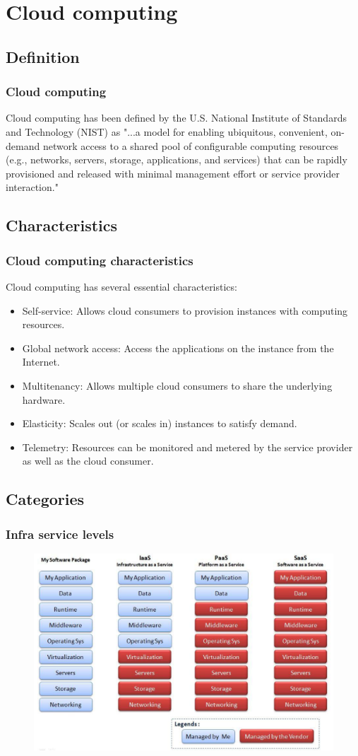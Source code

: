 \section{Cloud computing} 

\subsection{Definition} 
\begin{frame}
	\frametitle{Cloud computing}
	Cloud computing has been defined by the U.S. National
	Institute of Standards and Technology (NIST) as
	"...a model for enabling ubiquitous, convenient, on-demand
	network access to a shared pool of configurable computing
	resources (e.g., networks, servers, storage, applications,
	and services) that can be rapidly provisioned and released
	with minimal management effort or service provider interaction."
\end{frame}

\subsection{Characteristics}
\begin{frame}
	\frametitle{Cloud computing characteristics}
		Cloud computing has several essential characteristics:
	\begin{itemize}
		\item Self-service: Allows cloud consumers to provision instances with computing resources.
		\item Global network access: Access the applications on the instance from the Internet.
		\item Multitenancy: Allows multiple cloud consumers to share the underlying hardware.
		\item Elasticity: Scales out (or scales in) instances to satisfy demand.
		\item Telemetry: Resources can be monitored and metered by the service provider as well as the cloud consumer.
	\end{itemize}
\end{frame}

\subsection{Categories}
\begin{frame}
	\frametitle{Infra service levels}
	\begin{figure}
		\includegraphics[width=0.8\linewidth]{images/services_cats.png}
	\end{figure}
\end{frame}